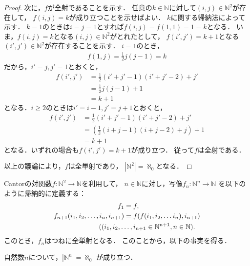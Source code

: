 \begin{proof}
     次に，$f$が全射であることを示す．
     任意の$k \in \mathbb{N}$に対して$(i,j) \in \mathbb{N}^2$が存在して，
     $f(i,j)=k$が成り立つことを示せばよい．
     $k$に関する帰納法によって示す．
     $k=1$のときは$i=j=1$とすれば$f(i,j)=f(1,1) = 1=k$となる．
     いま，$f(i,j) =k$となる$(i,j) \in \mathbb{N}^2$がとれたとして，
     $f(i',j')=k+1$となる$(i',j') \in \mathbb{N}^2$が存在することを示す．
     $i=1$のとき，
     \begin{align*}
       f(1,j) = \frac{1}{2}j(j-1) = k
     \end{align*}
     だから，$i'=j,  j'=1$とおくと，
     \begin{align*}
       f(i',j') & = \frac{1}{2} (i'+j'-1)(i'+j'-2) +j' \\ 
                & = \frac{1}{2}j(j-1) +1 \\
                & = k+1
     \end{align*}
     となる．$i \geq 2$のときは$i'=i-1,  j'=j+1$とおくと，
     \begin{align*}
       f(i',j') & = \frac{1}{2}(i'+j'-1)(i'+j'-2) + j' \\
                & = \left( \frac{1}{2} (i+j-1)(i+j-2) + j \right) +1 \\
                & = k +1
     \end{align*}
     となる．いずれの場合も$f(i',j')=k+1$が成り立つ．
     従って$f$は全射である．

     以上の議論により，$f$は全単射であり，
     $\left \lvert \mathbb{N} ^2 \right \rvert = \aleph_0$となる．
   \end{proof}

   Cantorの対関数$f: \mathbb{N}^2 \longrightarrow \mathbb{N}$を利用して，
   $n \in \mathbb{N} $に対し，写像$f_n : \mathbb{N} ^n \longrightarrow \mathbb{N}$
   を以下のように帰納的に定義する：
   \begin{align*}
     f_1 & = f , \\
     f_{n+1} ( i_1, i_2 , \ldots , i_n , i_{n+1} ) & =
     f( f( i_1 , i_2 , \ldots i_n ) ,i_{n+1})  \\ &  \hspace{-1.3cm} 
     ( ( i_1, i_2 , \ldots , i_{n+1} \in \mathbb{N} ^{n+1} , n \in \mathbb{N}) .
   \end{align*}
   このとき，$f_n$はつねに全単射となる．
   このことから，以下の事実を得る．

   \begin{coro}
     自然数$n$について，$\left \lvert \mathbb{N} ^n \right \rvert = \aleph_0$
     が成り立つ．
   \end{coro}

